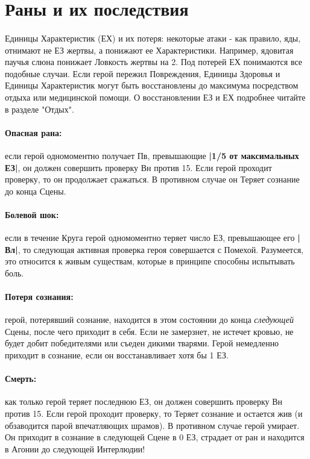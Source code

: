 \section{Раны и их последствия}
\paragraph{}
Единицы Характеристик (ЕХ) и их потеря: некоторые атаки - как правило, яды, отнимают не ЕЗ жертвы, а понижают ее Характеристики. Например, ядовитая паучья слюна понижает Ловкость жертвы на 2. Под потерей ЕХ понимаются все подобные случаи.
\newline
Если герой пережил Повреждения, Единицы Здоровья и Единицы Характеристик могут быть восстановлены до максимума посредством отдыха или медицинской помощи. О восстановлении ЕЗ и ЕХ подробнее читайте в разделе "Отдых".
\paragraph{Опасная рана:} если герой одномоментно получает Пв, превышающие \textbf{|1/5 от максимальных ЕЗ|}, он должен совершить проверку Вн против 15. Если герой проходит проверку, то он продолжает сражаться. В противном случае он Теряет сознание до конца Сцены.
\paragraph{Болевой шок:} если в течение Круга герой одномоментно теряет число ЕЗ, превышающее его \textbf{|Вл|}, то следующая активная проверка героя совершается с Помехой. Разумеется, это относится к живым существам, которые в принципе способны испытывать боль.
\paragraph{Потеря сознания:} герой, потерявший сознание, находится в этом состоянии до конца \textit{следующей} Сцены, после чего приходит в себя. Если не замерзнет, не истечет кровью, не будет добит победителями или съеден дикими тварями.
\newline
Герой немедленно приходит в сознание, если он восстанавливает хотя бы 1 ЕЗ.
\paragraph{Смерть:} как только герой теряет последнюю ЕЗ, он должен совершить проверку Вн против 15. Если герой проходит проверку, то Теряет сознание и остается жив (и обзаводится парой впечатляющих шрамов). В противном случае герой умирает. Он приходит в сознание в следующей Сцене в 0 ЕЗ, страдает от ран и находится в Агонии до следующей Интерлюдии!
